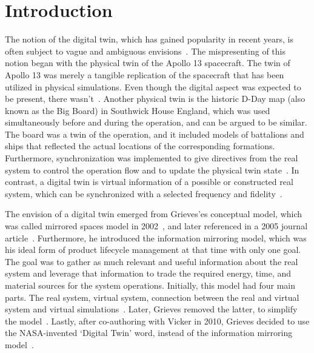 \documentclass{llncs}
\begin{document}
    \section{Introduction}\label{section:introduction}
    The notion of the digital twin, which has gained popularity in recent years, is often subject to vague and ambiguous envisions~\cite{Review1}.
    The mispresenting of this notion began with the physical twin of the Apollo 13 spacecraft. 
    The twin of Apollo 13 was merely a tangible replication of the spacecraft that has been utilized in physical simulations. 
    Even though the digital aspect was expected to be present, there wasn't~\cite{GrievesMichaelApolloMyth}.
    Another physical twin is the historic D-Day map (also known as the Big Board) in Southwick House England, 
    which was used simultaneously before and during the operation, and can be argued to be similar. 
    The board was a twin of the operation, and it included models of battalions and ships that reflected the actual 
    locations of the corresponding formations. Furthermore, synchronization was 
    implemented to give directives from the real system to control the operation 
    flow and to update the physical twin state~\cite{AMRC}.
    In contrast, a digital twin is virtual information of a possible or constructed real system, which can 
    be synchronized with a selected frequency and fidelity~\cite{Review1,Review2,digitaltwinconsortium2022}.

    The envision of a digital twin emerged from Grieves'es conceptual model, which was called mirrored spaces model in 2002~\cite{Originsofdigitaltwinconcept},
    and later referenced in a 2005 journal article~\cite{2005ArticleGrievesMichael}. 
    Furthermore, he introduced the information mirroring model, which was his ideal form of product lifecycle management
    at that time with only one goal. The goal was to gather as much relevant and useful information about the real system and leverage that information to trade the required energy, time, 
    and material sources for the system operations.
    Initially, this model had four main parts. The real system, virtual system, connection between the real and virtual system and virtual simulations~\cite{GrievesPLMBook}. 
    Later, Grieves removed the latter, to simplify the model~\cite{Originsofdigitaltwinconcept}. Lastly, after co-authoring with Vicker in 2010, 
    Grieves decided to use the NASA-invented `Digital Twin' word, instead of the information mirroring model~\cite{Originsofdigitaltwinconcept}.
\end{document}
